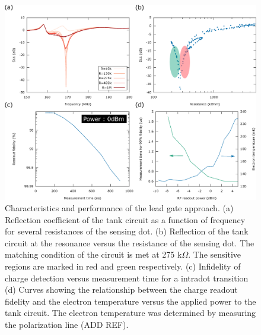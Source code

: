 \documentclass{article}
\begin{document}
\begin{figure}
	\includegraphics[width=\textwidth]{figures/Performance_figure/perfomance_fig.eps}
	\caption{Characteristics and performance of the lead gate approach. (a) Reflection coefficient of the tank circuit as a function of frequency for several resistances of the sensing dot. (b) Reflection of the tank circuit at the resonance versus the resistance of the sensing dot. The matching condition of the circuit is met at 275 k$\Omega$. The sensitive regions are marked in red and green respectively. (c) Infidelity of charge detection versus measurement time for a intradot transition (d) Curves showing the relationship between the charge readout fidelity and the electron temperature versus the applied power to the tank circuit. The electron temperature was determined by measuring the polarization line (ADD REF). }
	\label{fig:lead_gate_result}
\end{figure}	
\end{document}
